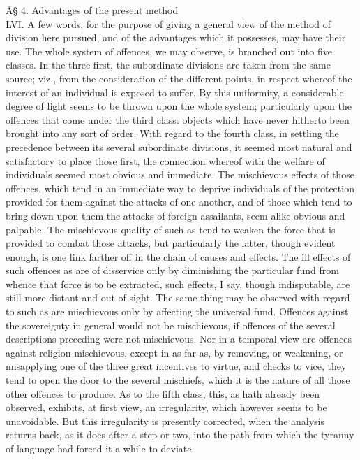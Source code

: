 \documentclass[12pt]{report}
\begin{document}
Â§ 4. Advantages of the present method\\
LVI. A few words, for the purpose of giving a general view of the method
of division here pursued, and of the advantages which it possesses, may
have their use. The whole system of offences, we may observe, is
branched out into five classes. In the three first, the subordinate
divisions are taken from the same source; viz., from the consideration
of the different points, in respect whereof the interest of an
individual is exposed to suffer. By this uniformity, a considerable
degree of light seems to be thrown upon the whole system; particularly
upon the offences that come under the third class: objects which have
never hitherto been brought into any sort of order. With regard to the
fourth class, in settling the precedence between its several subordinate
divisions, it seemed most natural and satisfactory to place those first,
the connection whereof with the welfare of individuals seemed most
obvious and immediate. The mischievous effects of those offences, which
tend in an immediate way to deprive individuals of the protection
provided for them against the attacks of one another, and of those which
tend to bring down upon them the attacks of foreign assailants, seem
alike obvious and palpable. The mischievous quality of such as tend to
weaken the force that is provided to combat those attacks, but
particularly the latter, though evident enough, is one link farther off
in the chain of causes and effects. The ill effects of such offences as
are of disservice only by diminishing the particular fund from whence
that force is to be extracted, such effects, I say, though indisputable,
are still more distant and out of sight. The same thing may be observed
with regard to such as are mischievous only by affecting the universal
fund. Offences against the sovereignty in general would not be
mischievous, if offences of the several descriptions preceding were not
mischievous. Nor in a temporal view are offences against religion
mischievous, except in as far as, by removing, or weakening, or
misapplying one of the three great incentives to virtue, and checks to
vice, they tend to open the door to the several mischiefs, which it is
the nature of all those other offences to produce. As to the fifth
class, this, as hath already been observed, exhibits, at first view, an
irregularity, which however seems to be unavoidable. But this
irregularity is presently corrected, when the analysis returns back, as
it does after a step or two, into the path from which the tyranny of
language had forced it a while to deviate.
\end{document}
